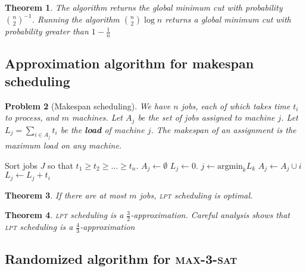 \documentclass[10pt, oneside, reqno]{amsart}
\theoremstyle{plain}%
\newtheorem{thm}{Theorem}[section]
\newtheorem{prob}[thm]{Problem}
\theoremstyle{definition}
\theoremstyle{remark}
\begin{document}
\begin{thm}
    The algorithm returns the global minimum cut with probability ${n \choose 2}^{-1}$.  Running the algorithm ${n \choose 2} \log n$ returns a global minimum cut with probability greater than $1 - \frac{1}{n}$
\end{thm}


\subsection{Approximation algorithm for makespan scheduling} %
\label{sub:approximation_algorithm_for_makespan_scheduling}
\begin{prob}[Makespan scheduling]
    We have $n$ jobs, each of which takes time $t_i$ to process, and $m$ machines.  Let $A_j$ be the set of jobs assigned to machine $j$.  Let $L_j = \sum_{i \in A_j} t_i$ be the \textbf{load} of machine $j$.  The \emph{makespan} of an assignment is the maximum load on any machine.  
\end{prob}


\begin{algorithm}[H]
    \label{alg:dynamic_rising_trend}
    \caption{Longest Processing Time (\textsc{lpt}) makespan approximation}
    \begin{algorithmic}[1]
        \State Sort jobs $J$ so that $t_1 \geq t_2 \geq \dots \geq t_n$.
        \State $A_j \gets \emptyset$
        \State $L_j \gets 0$.
            \State $j \gets \text{argmin}_k L_k$
            \State $A_j \gets A_j \cup i$
            \State $L_j \gets L_j + t_i$
        \EndFor
    \EndProcedure
    \end{algorithmic}
\end{algorithm}

\begin{thm}
    If there are at most $m$ jobs, \textsc{lpt} scheduling is optimal.
\end{thm}
\begin{thm}
    \textsc{lpt} scheduling is a $\frac{3}{2}$-approximation.  Careful analysis shows that \textsc{lpt} scheduling is a $\frac{4}{3}$-approximation
\end{thm}





\subsection{Randomized algorithm for \textsc{max-3-sat}} %
\label{sub:probablistic_algorithm_for_}
\end{document}
